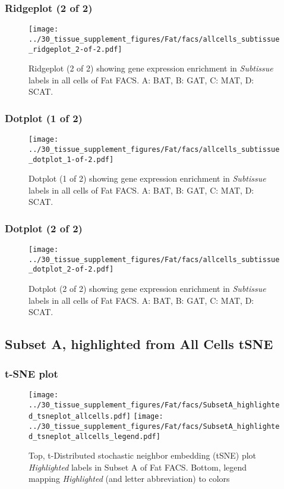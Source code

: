 \subsubsection{Ridgeplot (2 of 2)}
\begin{figure}[h]
\centering
\texttt{[image: ../30\_tissue\_supplement\_figures/Fat/facs/allcells\_subtissue\_ridgeplot\_2-of-2.pdf]}

\caption{ Ridgeplot (2 of 2)  showing gene expression enrichment in \emph{Subtissue} labels in all cells of Fat FACS. A: BAT, B: GAT, C: MAT, D: SCAT.}
\end{figure}


\clearpage

\subsubsection{Dotplot (1 of 2)}
\begin{figure}[h]
\centering
\texttt{[image: ../30\_tissue\_supplement\_figures/Fat/facs/allcells\_subtissue\_dotplot\_1-of-2.pdf]}

\caption{ Dotplot (1 of 2)  showing gene expression enrichment in \emph{Subtissue} labels in all cells of Fat FACS. A: BAT, B: GAT, C: MAT, D: SCAT.}
\end{figure}


\clearpage

\subsubsection{Dotplot (2 of 2)}
\begin{figure}[h]
\centering
\texttt{[image: ../30\_tissue\_supplement\_figures/Fat/facs/allcells\_subtissue\_dotplot\_2-of-2.pdf]}

\caption{ Dotplot (2 of 2)  showing gene expression enrichment in \emph{Subtissue} labels in all cells of Fat FACS. A: BAT, B: GAT, C: MAT, D: SCAT.}
\end{figure}


\clearpage
\subsection{Subset A, highlighted from All Cells tSNE}
\subsubsection{t-SNE plot}
\begin{figure}[h]
\centering
\texttt{[image: ../30\_tissue\_supplement\_figures/Fat/facs/SubsetA\_highlighted\_tsneplot\_allcells.pdf]}
\texttt{[image: ../30\_tissue\_supplement\_figures/Fat/facs/SubsetA\_highlighted\_tsneplot\_allcells\_legend.pdf]}
\caption{Top, t-Distributed stochastic neighbor embedding (tSNE) plot  \emph{Highlighted} labels in Subset A of Fat FACS. Bottom, legend mapping \emph{Highlighted} (and letter abbreviation) to colors}
\end{figure}


